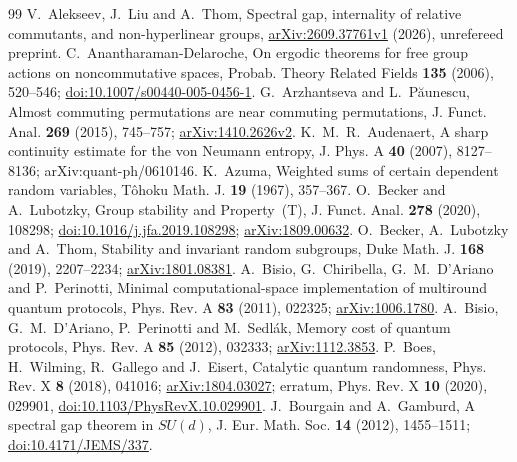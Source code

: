 \begin{thebibliography}{99}
 V.~Alekseev, J.~Liu and A.~Thom,
Spectral gap, internality of relative commutants, and non-hyperlinear groups,
\href{https://arxiv.org/abs/2609.37761v1}{arXiv:2609.37761v1} (2026), unrefereed preprint.
 C.~Anantharaman-Delaroche, On ergodic theorems for free group actions on noncommutative spaces,
Probab. Theory Related Fields \textbf{135} (2006), 520--546;
\href{https://doi.org/10.1007/s00440-005-0456-1}{doi:10.1007/s00440-005-0456-1}.
 G.~Arzhantseva and L.~P\u aunescu,
Almost commuting permutations are near commuting permutations,
J. Funct. Anal. \textbf{269} (2015), 745--757;
\href{https://arxiv.org/abs/1410.2626v2}{arXiv:1410.2626v2}.
 K.~M.~R.~Audenaert, A sharp continuity estimate for the von Neumann entropy, J. Phys. A \textbf{40} (2007), 8127--8136; arXiv:quant-ph/0610146.
 K.~Azuma, Weighted sums of certain dependent random variables, T\^ohoku Math. J. \textbf{19} (1967), 357--367.
 O.~Becker and A.~Lubotzky, Group stability and Property~(T),
J. Funct. Anal. \textbf{278} (2020), 108298;
\href{https://doi.org/10.1016/j.jfa.2019.108298}{doi:10.1016/j.jfa.2019.108298};
\href{https://arxiv.org/abs/1809.00632}{arXiv:1809.00632}.
 O.~Becker, A.~Lubotzky and A.~Thom,
Stability and invariant random subgroups, Duke Math. J. \textbf{168} (2019), 2207--2234;
\href{https://arxiv.org/abs/1801.08381}{arXiv:1801.08381}.
 A.~Bisio, G.~Chiribella, G.~M.~D'Ariano and P.~Perinotti, Minimal computational-space implementation
of multiround quantum protocols, Phys. Rev. A \textbf{83} (2011), 022325; \href{https://arxiv.org/abs/1006.1780}{arXiv:1006.1780}.
 A.~Bisio, G.~M.~D'Ariano, P.~Perinotti and M.~Sedl\'ak, Memory cost of quantum protocols,
Phys. Rev. A \textbf{85} (2012), 032333; \href{https://arxiv.org/abs/1112.3853}{arXiv:1112.3853}.
 P.~Boes, H.~Wilming, R.~Gallego and J.~Eisert,
Catalytic quantum randomness, Phys. Rev. X \textbf{8} (2018), 041016;
\href{https://arxiv.org/abs/1804.03027}{arXiv:1804.03027};
erratum, Phys. Rev. X \textbf{10} (2020), 029901,
\href{https://doi.org/10.1103/PhysRevX.10.029901}{doi:10.1103/PhysRevX.10.029901}.
 J.~Bourgain and A.~Gamburd, A spectral gap theorem in $SU(d)$,
J. Eur. Math. Soc. \textbf{14} (2012), 1455--1511;
\href{https://doi.org/10.4171/JEMS/337}{doi:10.4171/JEMS/337}.

\end{thebibliography}
